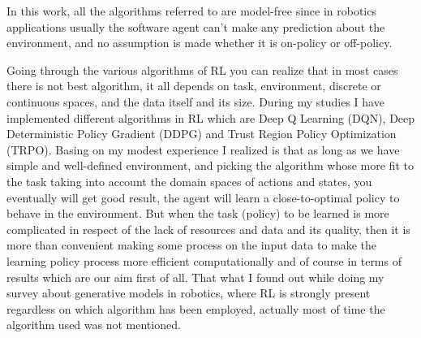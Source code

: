 In this work, all the algorithms referred to are model-free since in robotics applications usually the software agent can’t make any prediction about the environment, and no assumption is made whether it is on-policy or off-policy.

\vspace{0.3cm}
Going through the various algorithms of RL you can realize that in most cases there is not best algorithm, it all depends on task, environment, discrete or continuous spaces, and the data itself and its size. During my studies I have implemented different algorithms in RL which are Deep Q Learning (DQN), Deep Deterministic Policy Gradient (DDPG) and Trust Region Policy Optimization (TRPO). Basing on my modest experience I realized is that as long as we have simple and well-defined environment, and picking the algorithm whose more fit to the task taking into account the domain spaces of actions and states, you eventually will get good result, the agent will learn a close-to-optimal policy to behave in the environment. But when the task (policy) to be learned is more complicated in respect of the lack of resources and data and its quality, then it is more than convenient making some process on the input data to make the learning policy process more efficient computationally and of course in terms of results which are our aim first of all. That what I found out while doing my survey about generative models in robotics, where RL is strongly present regardless on which algorithm has been employed, actually most of time the algorithm used was not mentioned. 



\clearpage{\pagestyle{empty}\cleardoublepage}